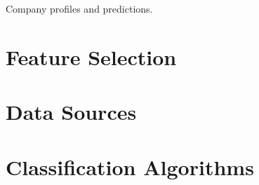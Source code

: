﻿\documentclass[../thesis/thesis.tex]{subfiles}
\begin{document}
\begin{table}[!htb]
    \centering
    \scalebox{0.9}{}
    \caption[Company profiles and predictions]{Company profiles and predictions.}
    \label{tab:evaluation:example_predictions}
\end{table}

\section{Feature Selection}

\section{Data Sources}

\section{Classification Algorithms}

\end{document}
